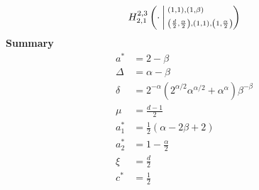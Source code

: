 \documentclass{article}
\newcommand{\FoxH}[5]{H_{#2}^{#1}\left(#3\:\middle\vert\: \begin{subarray}{l}#4\\[0.4em] #5\end{subarray}\right)}
\begin{document}
\begin{align*}
\FoxH{2,3}{2,1}{\cdot}{\left(1, 1\right), \left(1, \beta\right)}{\left(\frac{d}{2}, \frac{\alpha }{2}\right), \left(1, 1\right), \left(1, \frac{\alpha }{2}\right)}
\end{align*}
\noindent\textbf{Summary}
\begin{align*}
a^* &= 2-\beta \\
\Delta &= \alpha -\beta \\
\delta &= 2^{-\alpha } \left(2^{\alpha /2} \alpha ^{\alpha /2}+\alpha ^{\alpha }\right) \beta ^{-\beta } \\
\mu &= \frac{d-1}{2} \\
a_1^* &= \frac{1}{2} (\alpha -2 \beta +2) \\
a_2^* &= 1-\frac{\alpha }{2} \\
\xi &= \frac{d}{2} \\
c^* &= \frac{1}{2} \\
\end{align*}
\end{document}
